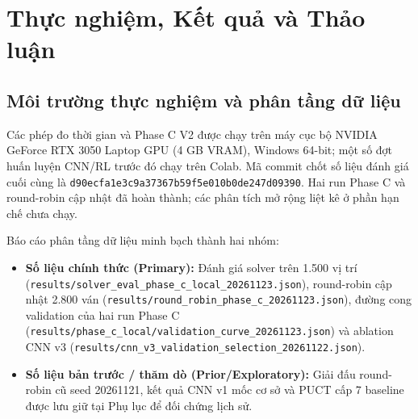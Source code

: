 \documentclass[11pt, a4paper]{article}
\begin{document}
\section{Thực nghiệm, Kết quả và Thảo luận}

\subsection{Môi trường thực nghiệm và phân tầng dữ liệu}
Các phép đo thời gian và Phase C V2 được chạy trên máy cục bộ NVIDIA GeForce RTX 3050 Laptop GPU (4 GB VRAM), Windows 64-bit; một số đợt huấn luyện CNN/RL trước đó chạy trên Colab. Mã commit chốt số liệu đánh giá cuối cùng là \texttt{d90ecfa1e3c9a37367b59f5e010b0de247d09390}. Hai run Phase C và round-robin cập nhật đã hoàn thành; các phân tích mở rộng liệt kê ở phần hạn chế chưa chạy.

Báo cáo phân tầng dữ liệu minh bạch thành hai nhóm:
\begin{itemize}
    \item \textbf{Số liệu chính thức (Primary):} Đánh giá solver trên 1.500 vị trí (\texttt{results/solver\_eval\_phase\_c\_local\_20261123.json}), round-robin cập nhật 2.800 ván (\texttt{results/round\_robin\_phase\_c\_20261123.json}), đường cong validation của hai run Phase C (\texttt{results/phase\_c\_local/validation\_curve\_20261123.json}) và ablation CNN v3 (\texttt{results/cnn\_v3\_validation\_selection\_20261122.json}).
    \item \textbf{Số liệu bản trước / thăm dò (Prior/Exploratory):} Giải đấu round-robin cũ seed 20261121, kết quả CNN v1 mốc cơ sở và PUCT cấp 7 baseline được lưu giữ tại Phụ lục để đối chứng lịch sử.
\end{itemize}
\end{document}
